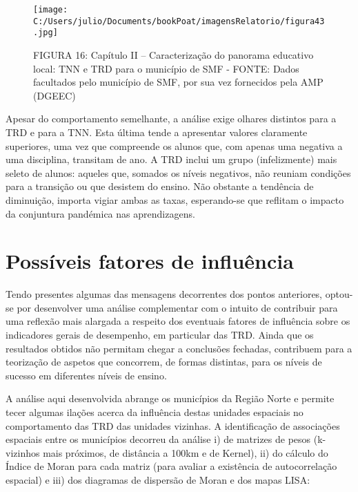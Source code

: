 \documentclass[
]{book}
\begin{document}
\begin{figure}
\centering
\texttt{[image: C:/Users/julio/Documents/bookPoat/imagensRelatorio/figura43.jpg]}
\caption{FIGURA 16: Capítulo II -- Caracterização do panorama educativo local: TNN e TRD para o município de SMF - FONTE: Dados facultados pelo município de SMF, por sua vez fornecidos pela AMP (DGEEC)}
\end{figure}

Apesar do comportamento semelhante, a análise exige olhares distintos para a TRD e para a TNN. Esta última tende a apresentar valores claramente superiores, uma vez que compreende os alunos que, com apenas uma negativa a uma disciplina, transitam de ano. A TRD inclui um grupo (infelizmente) mais seleto de alunos: aqueles que, somados os níveis negativos, não reuniam condições para a transição ou que desistem do ensino. Não obstante a tendência de diminuição, importa vigiar ambas as taxas, esperando-se que reflitam o impacto da conjuntura pandémica nas aprendizagens.

\hypertarget{possuxedveis-fatores-de-influuxeancia}{%
\section{\texorpdfstring{\textbf{Possíveis fatores de influência}}{Possíveis fatores de influência}}\label{possuxedveis-fatores-de-influuxeancia}}

Tendo presentes algumas das mensagens decorrentes dos pontos anteriores, optou-se por desenvolver uma análise complementar com o intuito de contribuir para uma reflexão mais alargada a respeito dos eventuais fatores de influência sobre os indicadores gerais de desempenho, em particular das TRD. Ainda que os resultados obtidos não permitam chegar a conclusões fechadas, contribuem para a teorização de aspetos que concorrem, de formas distintas, para os níveis de sucesso em diferentes níveis de ensino.

A análise aqui desenvolvida abrange os municípios da Região Norte e permite tecer algumas ilações acerca da influência destas unidades espaciais no comportamento das TRD das unidades vizinhas. A identificação de associações espaciais entre os municípios decorreu da análise i) de matrizes de pesos (k-vizinhos mais próximos, de distância a 100km e de Kernel), ii) do cálculo do Índice de Moran para cada matriz (para avaliar a existência de autocorrelação espacial) e iii) dos diagramas de dispersão de Moran e dos mapas LISA:
\end{document}
